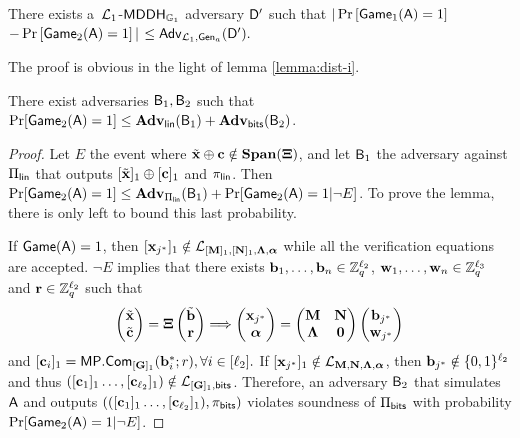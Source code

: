 \begin{lemma} There exists a\ $\mathcal{L}_1$-$\mathsf{MDDH}_{\mathbb{G}_1}$ adversary $\mathsf{D}'$ such that
$|\Pr\left[\mathsf{Game}_{1}(\mathsf{A})=1\right]$ $-\Pr\left[\mathsf{Game}_{2}(\mathsf{A})=1\right]|$ $\leq
    \mathsf{Adv}_{\mathcal{L}_1,\mathsf{Gen}_a}(\mathsf{D}').$
\end{lemma}

The proof is obvious in the light of lemma \ref{lemma:dist-i}. 
%

\begin{lemma}
There exist adversaries $\mathsf{B}_1,\mathsf{B}_2$ such that $\Pr[\mathsf{Game}_2(\mathsf{A})=1]\leq\mathbf{Adv}_{\mathsf{lin}}(\mathsf{B}_1)+\mathbf{Adv}_{\mathsf{bits}}(\mathsf{B}_2)$.
\end{lemma}

\begin{proof}
Let $E$ the event where ${\tilde{\mathbf{x}}}\oplus\mathbf{c}\notin\mathbf{Span}(\mathbf{{\Xi}})$, and let $\mathsf{B}_1$ the adversary against $\Pi_{\mathsf{lin}}$ that outputs $[{\tilde{\mathbf{x}}}]_1\oplus[\mathbf{c}]_1$ and $\pi_{\mathsf{lin}}$. Then $\Pr[\mathsf{Game}_2(\mathsf{A})=1]\leq\mathbf{Adv}_{\Pi_{\mathsf{lin}}}(\mathsf{B}_1)+\Pr[\mathsf{Game}_2(\mathsf{A})=1|\neg E]$.  To prove the lemma, there is only left to bound this last probability.

If $\mathsf{Game}(\mathsf{A})=1$, then $[\mathbf{x}_{j^*}]_1\notin \mathcal{L}_{[\mathbf{{M}}]_1,[\mathbf{{N}}]_1,\mathbf{{\Lambda}},{\boldsymbol \alpha}}$ while all the verification equations are accepted. $\neg E$ implies that there exists $\mathbf{b}_1,\ldots,\mathbf{b}_n\in\mathbb{Z}_q^{{\ell_2}}$, $\mathbf{w}_1,\ldots,\mathbf{w}_n\in\mathbb{Z}_q^{{\ell_3}}$ and $\mathbf{r}\in\mathbb{Z}_q^{\ell_2}$ such that
$$
\left(\begin{matrix}{\tilde{\mathbf{x}}}\\ {\tilde{\mathbf{c}}}\end{matrix}\right)=\mathbf{{\Xi}}
\left(\begin{matrix}{\tilde{\mathbf{b}}}\\\mathbf{r}\end{matrix}\right)
\Longrightarrow
\left(\begin{matrix}\mathbf{x}_{j^*}\\ {\boldsymbol \alpha}\end{matrix}\right)=
\begin{pmatrix}
    \mathbf{{M}}       & \mathbf{{N}}\\
    \mathbf{{\Lambda}} & \mathbf{{0}}
\end{pmatrix}
\left(\begin{matrix}
    \mathbf{b}_{j^*}\\
    \mathbf{w}_{j^*}
\end{matrix}\right)
$$
 and $[\mathbf{{c}}_i]_1=\mathsf{MP}.\mathsf{Com}_{[\mathbf{{G}}]_1}(\mathbf{b}_i^*;r), \forall i\in[{\ell_2}].$
If $[\mathbf{x}_{j^*}]_1 \notin \mathcal{L}_{\mathbf{{M}},\mathbf{{N}},\mathbf{{\Lambda}},{\boldsymbol \alpha}}$, then $\mathbf{b}_{j^*}\notin\{0,1\}^{\ell_2}$ and thus $([\mathbf{c}_1]_1\ldots,[\mathbf{c}_{\ell_2}]_1)\notin\mathcal{L}_{[\mathbf{{G}}]_1,\mathsf{bits}}$. Therefore, an adversary $\mathsf{B}_2$ that simulates $\mathsf{A}$ and outputs $(([\mathbf{c}_1]_1\ldots,[\mathbf{c}_{\ell_2}]_1),\pi_{\mathsf{bits}})$ violates soundness of $\Pi_{\mathsf{bits}}$ with probability $\Pr[\mathsf{Game}_2(\mathsf{A})=1|\neg E]$.
\end{proof}

